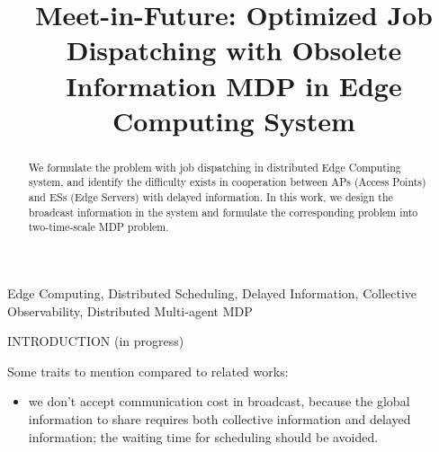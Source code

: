 \documentclass[10pt, conference, letterpaper]{IEEEtran}
\begin{document}
    \title{
        Meet-in-Future: Optimized Job Dispatching with Obsolete Information MDP in Edge Computing System
    }
    \author{
    }
    \maketitle

    \begin{abstract}
        \label{sec:abstract}
        We formulate the problem with job dispatching in distributed Edge Computing system, and identify the difficulty exists in cooperation between APs (Access Points) and ESs (Edge Servers) with delayed information. In this work, we design the broadcast information in the system and formulate the corresponding problem into two-time-scale MDP problem.
    \end{abstract}

    \begin{IEEEkeywords}
        Edge Computing, Distributed Scheduling, Delayed Information, Collective Observability, Distributed Multi-agent MDP
    \end{IEEEkeywords}

    \begin{section}{INTRODUCTION}
        \label{sec:introduction}
        (in progress)

        Some traits to mention compared to related works:
        \begin{itemize}
            \item we don't accept communication cost in broadcast, because the global information to share requires both collective information and delayed information; the waiting time for scheduling should be avoided.
        \end{itemize}
    \end{section}
\end{document}
